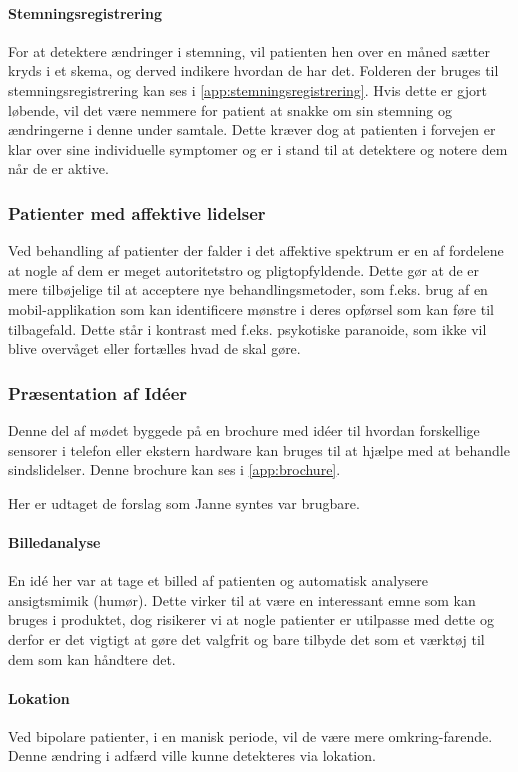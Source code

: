 \paragraph{Stemningsregistrering}
For at detektere ændringer i stemning, vil patienten hen over en måned sætter kryds i et skema, og derved indikere hvordan de har det.
Folderen der bruges til stemningsregistrering kan ses i \cref{app:stemningsregistrering}.
Hvis dette er gjort løbende, vil det være nemmere for patient at snakke om sin stemning og ændringerne i denne under samtale.
Dette kræver dog at patienten i forvejen er klar over sine individuelle symptomer og er i stand til at detektere og notere dem når de er aktive.

\subsubsection{Patienter med affektive lidelser}
Ved behandling af patienter der falder i det affektive spektrum er en af fordelene at nogle af dem er meget autoritetstro og pligtopfyldende.
Dette gør at de er mere tilbøjelige til at acceptere nye behandlingsmetoder, som f.eks. brug af en mobil-applikation som kan identificere mønstre i deres opførsel som kan føre til tilbagefald.
Dette står i kontrast med f.eks. psykotiske paranoide, som ikke vil blive overvåget eller fortælles hvad de skal gøre.

\subsubsection{Præsentation af Idéer}\label{janne_ideer}
Denne del af mødet byggede på en brochure med idéer til hvordan forskellige sensorer i telefon eller ekstern hardware kan bruges til at hjælpe med at behandle sindslidelser. 
Denne brochure kan ses i \cref{app:brochure}.

Her er udtaget de forslag som Janne syntes var brugbare.

\paragraph{Billedanalyse}
En idé her var at tage et billed af patienten og automatisk analysere ansigtsmimik (humør).
Dette virker til at være en interessant emne som kan bruges i produktet, dog risikerer vi at nogle patienter er utilpasse med dette og derfor er det vigtigt at gøre det valgfrit og bare tilbyde det som et værktøj til dem som kan håndtere det.

\paragraph{Lokation}
Ved bipolare patienter, i en manisk periode, vil de være mere omkring-farende.
Denne ændring i adfærd ville kunne detekteres via lokation.

